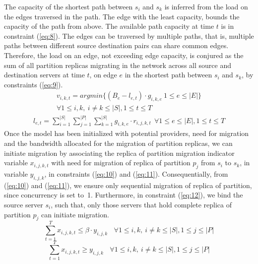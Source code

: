 The capacity of the shortest path between $s_{i}$ and $s_{k}$ is inferred from the load on the edges traversed in the path. The edge with the least capacity, bounds the capacity of the path from above. The available path capacity at time $t$ is in constraint (\ref{eq:8}). The edges can be traversed by multiple paths, that is, multiple paths between different source destination pairs can share common edges. Therefore, the load on an edge, not exceeding edge capacity, is conjured as the sum of all partition replicas migrating in the network across all source and destination servers at time $t$, on edge $e$ in the shortest path between $s_{i}$ and $s_{k}$, by constraints (\ref{eq:9}).
\vspace{-3mm}
\begin{multline}
v_{i,k,t}=argmin\{\left(B_e-l_{e,t}\right)\cdot{}g_{i,k,e}\ 1\leq{}e\leq{}\left\vert{}E\right\vert{} \} \\  \forall{}1\leq{}i,k,\
i\not=k\leq{}\left\vert{}S\right\vert{},1\leq{}t\leq{}T
\label{eq:8}
\end{multline}
\vspace{-10mm}
\begin{multline}
l_{e,t}=\sum_{i=1}^{\left\vert{}S\right\vert{}}\sum_{j=1}^{\left\vert{}P\right\vert{}}\sum_{k=1}^{\left\vert{}S\right\vert{}}g_{i,k,e}\cdot{}r_{i,j,k,t}\ \ \forall{}1\leq{}e\leq{}\left\vert{}E\right\vert{},1\leq{}t\leq{}T
\label{eq:9}
\end{multline}
Once the model has been initialized with potential providers, need for migration and the bandwidth allocated for the migration of partition replicas, we can initiate migration by associating the replica of partition migration indicator variable $x_{i,j,k,t}$ with need for migration of replica of partition $p_{j}$ from $s_{i}$ to $s_{k}$, in variable $y_{i,j,k}$, in constraints (\ref{eq:10}) and (\ref{eq:11}). Consequentially, from (\ref{eq:10}) and (\ref{eq:11}), we ensure only sequential migration of replica of partition, since concurrency is set to~1. Furthermore, in constraint (\ref{eq:12}), we bind the source server $s_{i}$, such that, only those servers that hold complete replica of partition $p_{j}$ can initiate migration.  
\begin{equation}
\sum_{t=1}^Tx_{i,j,k,t}\leq{}\beta{}\cdot{}y_{i,j,k}  \ \ \ \ \forall{}1\leq{}i,k,\
i\not=k\leq{}\left\vert{}S\right\vert{},1\leq{}j\leq{}\left\vert{}P\right\vert{}
\label{eq:10}
\end{equation}
\begin{equation}
\sum_{t=1}^Tx_{i,j,k,t}\geq{}y_{i,j,k}   \ \ \ \  \forall{}1\leq{}i,k,\
i\not=k\leq{}\left\vert{}S\right\vert{},1\leq{}j\leq{}\left\vert{}P\right\vert{}
\label{eq:11}
\end{equation}
